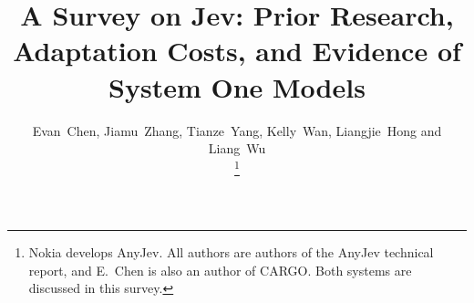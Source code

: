 \documentclass{sigkddExp}
\newcommand{\rev}[1]{#1}
\begin{document}
\title{A Survey on Jev: Prior Research, Adaptation Costs, and Evidence of System One Models}

\author{
\alignauthor Evan~Chen, Jiamu~Zhang, Tianze~Yang, Kelly~Wan, Liangjie~Hong and Liang~Wu\\
\thanks{Nokia develops AnyJev. \rev{All authors are authors of the AnyJev technical report, and E.~Chen is also an author of CARGO.} Both systems are discussed in this survey.}\\
}

\maketitle













\end{document}
